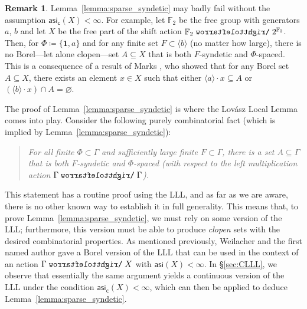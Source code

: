 \documentclass[11pt,reqno,psamsfonts]{amsart}
\theoremstyle{bfnote}
\theoremstyle{definition}
\newtheorem{remk}[theo]{Remark}
\theoremstyle{remark}
\newcommand{\0}{\varnothing}
\newcommand{\set}[1]{\{#1\}}
\newcommand{\defeq}{\coloneqq}
\newcommand{\bemph}[1]{{\normalfont#1}}
\newcommand{\ep}[1]{\bemph{(}#1\bemph{)}}
\newcommand{\red}[1]{{\color{red}#1}}
\newcommand{\todo}[1]{\red{\textbf{\upshape{[#1]}}}}
\newcommand{\acts}{\mathrel{\reflectbox{$\righttoleftarrow$}}}
\newcommand{\G}{\Gamma}
\newcommand{\asi}{\mathsf{asi}}
\newcommand{\casi}{\asi_{\mathsf{c}}}
\newcommand{\iden}{\mathbf{1}}
\numberwithin{equation}{section}
\begin{document}
    \begin{remk}
        Lemma~\ref{lemma:sparse_syndetic} may badly fail without the assumption $\casi(X) < \infty$. For example, let $\mathbb{F}_2$ be the free group with generators $a$, $b$ and let $X$ be the free part of the shift action $\mathbb{F}_2 \acts 2^{\mathbb{F}_2}$. Then, for $\Phi \defeq \set{\iden, a}$ and for any finite set $F \subset \langle b \rangle$ (no matter how large), there is no Borel---let alone clopen---set $A \subseteq X$ that is both $F$-syndetic and $\Phi$-spaced. This is a consequence of a result of Marks \cite[Thm.~1.6]{Marks}, who showed that %
        for any Borel set $A \subseteq X$, there exists an element $x \in X$ such that either $\langle a \rangle \cdot x \subseteq A$ or $(\langle b \rangle \cdot x) \cap A = \0$.
    \end{remk}

    The proof of Lemma~\ref{lemma:sparse_syndetic} is where the Lov\'asz Local Lemma comes into play. %
    Consider the following purely combinatorial fact (which is implied by Lemma~\ref{lemma:sparse_syndetic}):

    \begin{quote}
        \textsl{For all finite $\Phi \subset \G$ and sufficiently large finite $F \subset \G$, %
        there is a set $A \subseteq \G$ that is both $F$-syndetic and $\Phi$-spaced \ep{with respect to the left multiplication action $\G \acts \G$}.}
    \end{quote}

    \noindent This statement has a routine proof using the LLL, and as far as we are aware, there is no other known way to establish it in full generality. This means that, to prove Lemma~\ref{lemma:sparse_syndetic}, we must rely on some version of the LLL; furthermore, this version must be able to produce \emph{clopen} sets with the desired combinatorial properties. As mentioned previously, Weilacher and the first named author \cite{BW} gave a {Borel} version of the LLL that can be used in the context of an action $\G \acts X$ with $\asi(X) < \infty$. In \S\ref{sec:CLLL}, we observe that essentially the same argument yields a {continuous} version of the LLL under the condition $\casi(X) < \infty$, which can then be applied to deduce Lemma~\ref{lemma:sparse_syndetic}.
\end{document}
